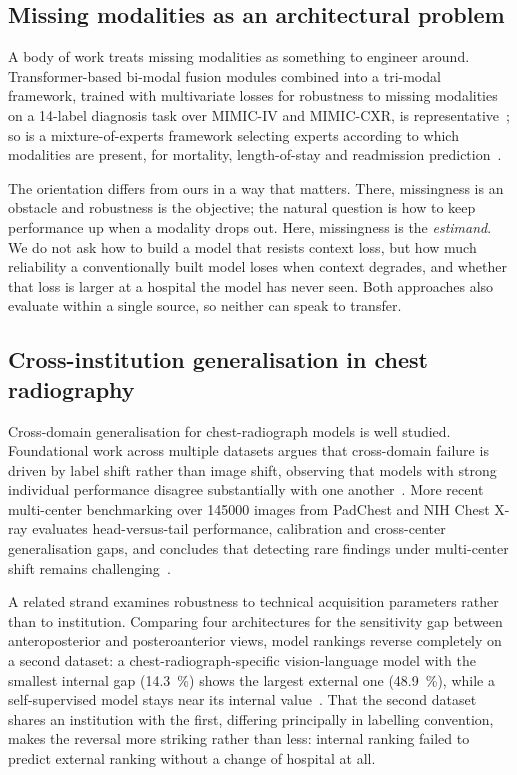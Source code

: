 \subsection{Missing modalities as an architectural problem}

A body of work treats missing modalities as something to engineer around.
Transformer-based bi-modal fusion modules combined into a tri-modal framework,
trained with multivariate losses for robustness to missing modalities on a
14-label diagnosis task over MIMIC-IV and MIMIC-CXR, is
representative~\cite{wang2025missing}; so is a mixture-of-experts framework
selecting experts according to which modalities are present, for mortality,
length-of-stay and readmission prediction~\cite{wang2025moehealth}.

The orientation differs from ours in a way that matters. There, missingness is
an obstacle and robustness is the objective; the natural question is how to keep
performance up when a modality drops out. Here, missingness is the
\emph{estimand}. We do not ask how to build a model that resists context loss,
but how much reliability a conventionally built model loses when context
degrades, and whether that loss is larger at a hospital the model has never
seen. Both approaches also evaluate within a single source, so neither can speak
to transfer.

\subsection{Cross-institution generalisation in chest radiography}

Cross-domain generalisation for chest-radiograph models is well studied.
Foundational work across multiple datasets argues that cross-domain failure is
driven by label shift rather than image shift, observing that models with strong
individual performance disagree substantially with one
another~\cite{cohen2020limits}. More recent multi-center benchmarking over
\num{145000} images from PadChest and NIH Chest X-ray evaluates head-versus-tail
performance, calibration and cross-center generalisation gaps, and concludes
that detecting rare findings under multi-center shift remains
challenging~\cite{cxrlt2026}.

A related strand examines robustness to technical acquisition parameters rather
than to institution. Comparing four architectures for the sensitivity gap
between anteroposterior and posteroanterior views, model rankings reverse
completely on a second dataset: a chest-radiograph-specific vision-language
model with the smallest internal gap (\SI{14.3}{\percent}) shows the largest
external one (\SI{48.9}{\percent}), while a self-supervised model stays near
its internal value~\cite{farquhar2026acquisition}. That the second dataset
shares an institution with the first, differing principally in labelling
convention, makes the reversal more striking rather than less: internal ranking
failed to predict external ranking without a change of hospital at all.

